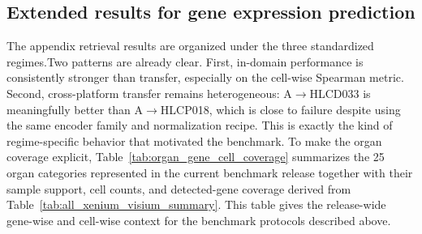 \documentclass{article}
\begin{document}
\subsection{Extended results for gene expression prediction}
\noindent
The appendix retrieval results are organized under the three standardized regimes.Two patterns are already clear. First, in-domain performance is consistently stronger than transfer, especially on the cell-wise Spearman metric. Second, cross-platform transfer remains heterogeneous: A$\!\rightarrow\!$HLCD033 is meaningfully better than A$\!\rightarrow\!$HLCP018, which is close to failure despite using the same encoder family and normalization recipe. This is exactly the kind of regime-specific behavior that motivated the benchmark.
\noindent
To make the organ coverage explicit, Table~\ref{tab:organ_gene_cell_coverage} summarizes the 25 organ categories represented in the current benchmark release together with their sample support, cell counts, and detected-gene coverage derived from Table~\ref{tab:all_xenium_visium_summary}. This table gives the release-wide gene-wise and cell-wise context for the benchmark protocols described above.
\end{document}
